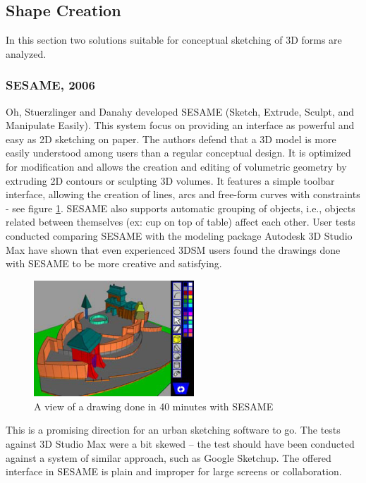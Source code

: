 \subsection{Shape Creation}

In this section two solutions suitable for conceptual sketching of 3D forms are analyzed.

\subsubsection{SESAME, 2006}

Oh, Stuerzlinger and Danahy \cite{SESAME3D} developed SESAME
(Sketch, Extrude, Sculpt, and Manipulate Easily).
This system focus on providing an interface as powerful and easy as 2D sketching on paper.
The authors defend that a 3D model is more easily understood among users than a regular conceptual design.
It is optimized for modification and allows the creation and editing of volumetric geometry
by extruding 2D contours or sculpting 3D volumes.
It features a simple toolbar interface, allowing the creation of lines,
arcs and free-form curves with constraints - see figure \ref{FIG-SESAME}.
SESAME also supports automatic grouping of objects, i.e., objects related
between themselves (ex: cup on top of table) affect each other.
User tests conducted comparing SESAME with the modeling package
Autodesk 3D Studio Max have shown that even experienced 3DSM users found
the drawings done with SESAME to be more creative and satisfying.

\begin{figure}[!ht]
	\centering
	\includegraphics[width=6cm]{gfx/sesame.png}
	\caption{A view of a drawing done in 40 minutes with SESAME}
	\label{FIG-SESAME}
\end{figure}


This is a promising direction for an urban sketching software to go.
The tests against 3D Studio Max were a bit skewed -- the test should
have been conducted against a system of similar approach, such as Google Sketchup.
The offered interface in SESAME is plain and improper for large screens or collaboration.


